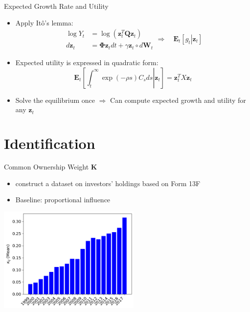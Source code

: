 \documentclass[
  10pt,
  aspectratio=169,   %
]{beamer}
\theoremstyle{plain}
\begin{document}
\begin{frame}{Expected Growth Rate and Utility}
  \label{aggregation}
  \begin{itemize}
    \item Apply Itô's lemma:\hfill \hyperlink{Y_process}{}
    \[
    \begin{array}{cl}
      \log Y_{t} & =\log\left(\bm{z}_{t}^{T}\bm{Q}\bm{z}_{t}\right)\\
      d\bm{z}_{t} & =\bm{\Phi}\bm{z}_{t}dt+\gamma\bm{z}_{t} \circ d\bm{W}_{t}
    \end{array}
    \Longrightarrow \quad \bm{E}_{t}\left[\left.g_{t}\right|\bm{z}_{t}\right]
    \]
    \item Expected utility is expressed in quadratic form: \hfill \hyperlink{X}{}
    \[
      \bm{E}_{t}\left[\left.\int_{t}^{\infty}\exp\left(-\rho s\right)C_{s}ds\right|\bm{z}_{t}\right]=\bm{z}_{t}^{T}X\bm{z}_{t}
    \]
    \item Solve the equilibrium once $\Longrightarrow$ Can compute expected growth and utility for any $\bm{z}_{t}$
  \end{itemize}
\end{frame}

\section{Identification}

\begin{frame}{Common Ownership Weight $\bm{K}$}
  \begin{itemize}
    \item \citet{Backus2021-yt} construct a dataset on investors' holdings based on Form 13F
    \item Baseline: \citet{Rotemberg1984-jz} proportional influence \hfill\hyperlink{rotemberg}{}
  \end{itemize}
  \begin{center}
    \includegraphics[width=7cm]{figures/kappa}
  \end{center}
\end{frame}
\end{document}
